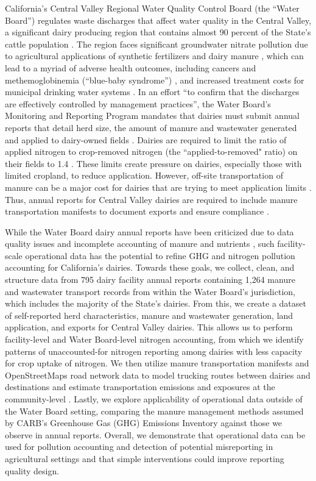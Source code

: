 \documentclass{iopjournal}
\begin{document}
California's Central Valley Regional Water Quality Control Board (the ``Water Board'') regulates waste discharges that affect water quality in the Central Valley, a significant dairy producing region that contains almost 90 percent of the State's cattle population \cite{SWRCB_2026_Order}. The region faces significant groundwater nitrate pollution due to agricultural applications of synthetic fertilizers and dairy manure \cite{Harter_Lund_2012, SWRCB_2026_Order}, which can lead to a myriad of adverse health outcomes, including cancers and methemoglobinemia (``blue-baby syndrome'') \cite{Ward_2018}, and increased treatment costs for municipal drinking water systems \cite{Jensen_2011}. In an effort ``to confirm that the discharges are effectively controlled by management practices'', the Water Board's Monitoring and Reporting Program mandates that dairies must submit annual reports \cite{CVRWQCB_2013_Order} that detail herd size, the amount of manure and wastewater generated and applied to dairy-owned fields \cite{Robertson_2026}. Dairies are required to limit the ratio of applied nitrogen to crop-removed nitrogen (the ``applied-to-removed" ratio) on their fields to 1.4 \cite{CVRWQCB_2013_Order}. These limits create pressure on dairies, especially those with limited cropland, to reduce application. However, off-site transportation of manure can be a major cost for dairies that are trying to meet application limits \cite{USDA_2003}. Thus, annual reports for Central Valley dairies are required to include manure transportation manifests to document exports and ensure compliance \cite{CVRWQCB_2013_Order}. 

While the Water Board dairy annual reports have been criticized due to data quality issues and incomplete accounting of manure and nutrients \cite{Robertson_2026, SWRCB_2026_Order}, such facility-scale operational data has the potential to refine GHG and nitrogen pollution accounting for California's dairies. Towards these goals, we collect, clean, and structure data from 795 dairy facility annual reports containing 1,264 manure and wastewater transport records from within the Water Board's jurisdiction, which includes the majority of the State's dairies. From this, we create a dataset of self-reported herd characteristics, manure and wastewater generation, land application, and exports for Central Valley dairies. This allows us to perform facility-level and Water Board-level nitrogen accounting, from which we identify patterns of unaccounted-for nitrogen reporting among dairies with less capacity for crop uptake of nitrogen. We then utilize manure transportation manifests and OpenStreetMaps road network data \cite{OSM_California_2025} to model trucking routes between dairies and destinations and estimate transportation emissions and exposures at the community-level \cite{Census_Places}. Lastly, we explore applicability of operational data outside of the Water Board setting, comparing the manure management methods assumed by CARB's Greenhouse Gas (GHG) Emissions Inventory \cite{CARB_2000_2023_GHG_Methods} against those we observe in annual reports. Overall, we demonstrate that operational data can be used for pollution accounting and detection of potential misreporting in agricultural settings and that simple interventions could improve reporting quality design.
\end{document}
